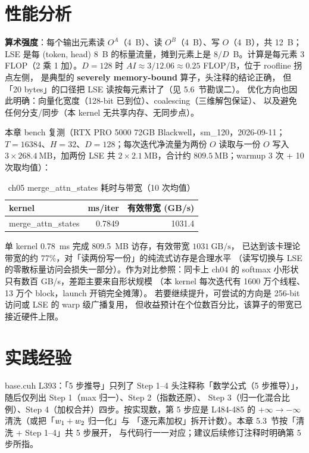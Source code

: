 \section{性能分析}

\textbf{算术强度}：每个输出元素读 $O^{A}$（4~B）、读 $O^{B}$（4~B）、写
$O$（4~B），共 12~B；LSE 是每 (token, head) 8~B 的标量流量，摊到元素上是
$8/D$~B。计算是每元素 3 FLOP（2 乘 1 加）。$D = 128$ 时
$AI \approx 3 / 12.06 \approx 0.25$ FLOP/B，位于 roofline 拐点左侧，
是典型的 \textbf{severely memory-bound} 算子，头注释的结论正确，
但「20 bytes」的口径把 LSE 读按每元素计了（见 5.6~节勘误二）。
优化方向也因此明确：向量化宽度（128-bit 已到位）、coalescing（三维解包保证）、
以及避免任何分支/同步（本 kernel 无共享内存、无同步点）。

本章 bench 复测（RTX PRO 5000 72GB Blackwell，sm\_120，2026-09-11；
$T = 16384$、$H = 32$、$D = 128$；每次迭代净流量为两份 $O$ 读取与一份 $O$ 写入
$3 \times 268.4~\text{MB}$，加两份 LSE 共 $2 \times 2.1~\text{MB}$，合计约
$809.5~\text{MB}$；warmup 3 次 + 10 次取均值）：

\begin{table}[htbp]
\centering
\caption{ch05 merge\_attn\_states 耗时与带宽（10 次均值）}
\label{tab:5-bench}
\begin{tabular}{lrr}
\toprule
kernel & ms/iter & 有效带宽 (GB/s) \\
\midrule
merge\_attn\_states & 0.7849 & 1031.4 \\
\bottomrule
\end{tabular}
\end{table}

单 kernel 0.78~ms 完成 809.5~MB 访存，有效带宽 $1031~\text{GB/s}$，
已达到该卡理论带宽的约 77\%，对「读两份写一份」的纯流式访存是合理水平
（读写切换与 LSE 的零散标量访问会损失一部分）。作为对比参照：同卡上
ch04 的 softmax 小形状只有数百 GB/s，差距主要来自形状规模
（本 kernel 每次迭代有 1600 万个线程、13 万个 block，launch 开销完全摊薄）。
若要继续提升，可尝试的方向是 256-bit 访问或 LSE 的 warp 级广播复用，
但收益预计在个位数百分比，该算子的带宽已接近硬件上限。

\section{实践经验}

\begin{kaogu}[F3]{base.cuh L393：「5 步推导」只列了 Step 1--4}
  头注释称「数学公式（5 步推导）」，随后仅列出 Step 1（max 归一）、Step 2（指数还原）、
  Step 3（归一化混合比例）、Step 4（加权合并）四步。按实现数，第 5 步应是
  L484-485 的 $+\infty \to -\infty$ 清洗（或把「$w\sb{1} + w\sb{2}$ 归一化」与
  「逐元素加权」拆开计数）。本章 5.3~节按「清洗 + Step 1--4」共 5 步展开，
  与代码行一一对应；建议后续修订注释时明确第 5 步所指。
\end{kaogu}

